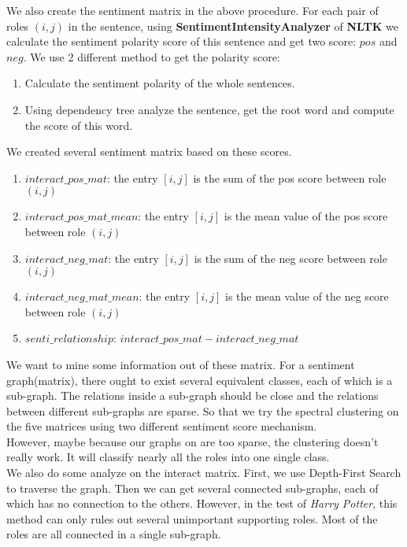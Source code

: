 \documentclass[11pt]{article}
\begin{document}
We also create the sentiment matrix in the above procedure. For each pair of roles $(i, j)$
in the sentence, using \textbf{SentimentIntensityAnalyzer} of \textbf{NLTK} we calculate the sentiment polarity score of this sentence and get two score: $pos$ and $neg$. We use 2 different method to get the polarity score:
\begin{enumerate}
    \item Calculate the sentiment polarity of the whole sentences.
    \item Using dependency tree analyze the sentence, get the root word and compute the score of this word.
\end{enumerate}
We created several sentiment matrix based on these scores.
\begin{enumerate}
    \item $interact\_pos\_mat$: the entry $[i, j]$ is the sum of the pos score between role $(i, j)$
    \item $interact\_pos\_mat\_mean$: the entry $[i, j]$ is the mean value of the pos score between role $(i, j)$
    \item $interact\_neg\_mat$: the entry $[i, j]$ is the sum of the neg score between role $(i, j)$
    \item $interact\_neg\_mat\_mean$: the entry $[i, j]$ is the mean value of the neg score between role $(i, j)$
    \item $senti\_relationship$: $interact\_pos\_mat - interact\_neg\_mat$
\end{enumerate}

We want to mine some information out of these matrix. For a sentiment graph(matrix), there ought to exist several equivalent classes, each of which is a sub-graph. The relations inside a sub-graph should be close and the relations between different sub-graphs are sparse. So that we try the spectral clustering on the five matrices using two different sentiment score mechanism. \\
However, maybe because our graphs on are too sparse, the clustering doesn't really work. It will classify nearly all the roles into one single class. \\

We also do some analyze on the interact matrix. First, we use Depth-First Search to traverse the graph. Then we can get several connected sub-graphs, each of which has no connection to the others. However, in the test of \textit{Harry Potter}, this method can only rules out several unimportant supporting roles. Most of the roles are all connected in a single sub-graph.
\end{document}
